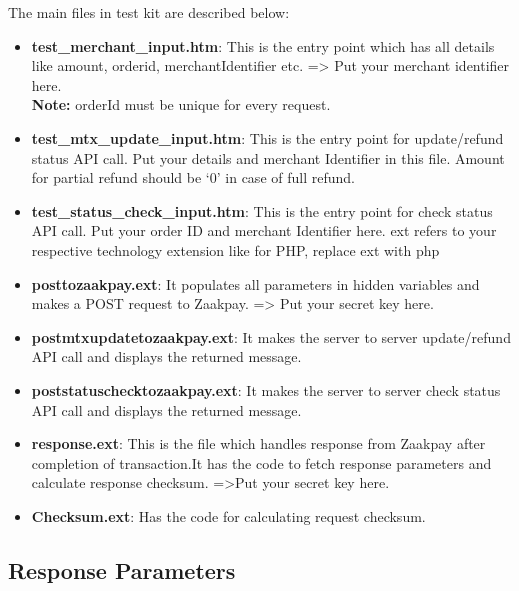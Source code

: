 \documentclass{article}
\begin{document}
The main files in test kit are described below:
\begin{itemize}
\item {\bfseries test\_merchant\_input.htm}: This is the entry point which has all details like amount, orderid, merchantIdentifier etc. => Put your merchant identifier here.\\
{\bfseries Note:} orderId must be unique for every request.
\item {\bfseries test\_mtx\_update\_input.htm}: This is the entry point for update/refund status API call.
Put your details and merchant Identifier in this file. Amount for partial refund should be ‘0’ in case of full refund.
\item {\bfseries test\_status\_check\_input.htm}: This is the entry point for check status API call. Put your order ID and merchant Identifier here. ext refers to your respective technology extension like for PHP, replace ext with php
\item {\bfseries posttozaakpay.ext}: It populates all parameters in hidden variables and makes a POST request to Zaakpay. => Put your secret key here.
\item {\bfseries postmtxupdatetozaakpay.ext}: It makes the server to server update/refund API call and displays the returned message.
\item {\bfseries poststatuschecktozaakpay.ext}: It makes the server to server check status API call and displays the returned message.
\item {\bfseries response.ext}: This is the file which handles response from Zaakpay after completion of transaction.It has the code to fetch response parameters and calculate response checksum. =>Put your secret key here.
\item {\bfseries Checksum.ext}: Has the code for calculating request checksum.
\end{itemize}

\subsection{Response Parameters}
\end{document}
